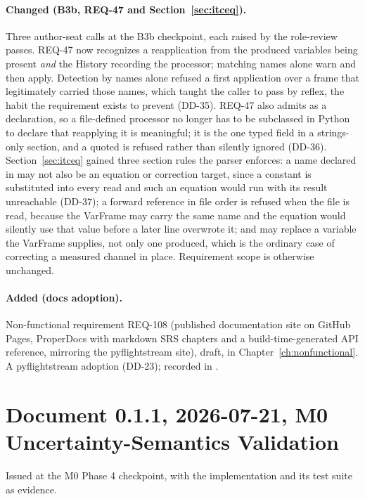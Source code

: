 \paragraph{Changed (B3b, REQ-47 and Section~\ref{sec:itceq}).} Three
author-seat calls at the B3b checkpoint, each raised by the role-review
passes. \stable{} REQ-47 now recognizes a reapplication from the
produced variables being present \emph{and} the History recording the
processor; matching names alone warn and then apply. Detection by names
alone refused a first application over a frame that legitimately
carried those names, which taught the caller to pass 
by reflex, the habit the requirement exists to prevent (DD-35). REQ-47
also admits  as a declaration, so a
file-defined processor no longer has to be subclassed in Python to
declare that reapplying it is meaningful; it is the one typed field in
a strings-only section, and a quoted  is refused rather
than silently ignored (DD-36). Section~\ref{sec:itceq} gained three
section rules the parser enforces: a name declared in
\code{[constants]} may not also be an equation or correction target,
since a constant is substituted into every read and such an equation
would run with its result unreachable (DD-37); a forward reference in
file order is refused when the file is read, because the VarFrame may
carry the same name and the equation would silently use that value
before a later line overwrote it; and \code{[corrections]} may replace
a variable the VarFrame supplies, not only one \code{[equations]}
produced, which is the ordinary case of correcting a measured channel
in place. Requirement scope is otherwise unchanged.

\paragraph{Added (docs adoption).} Non-functional requirement REQ-108
(published documentation site on GitHub Pages, ProperDocs with markdown
SRS chapters and a build-time-generated API reference, mirroring the
pyflightstream site), draft, in Chapter~\ref{ch:nonfunctional}. A
pyflightstream adoption (DD-23); recorded in
.

\section*{Document 0.1.1, 2026-07-21, M0 Uncertainty-Semantics Validation}

Issued at the M0 Phase 4 checkpoint, with the implementation and its
test suite as evidence.

